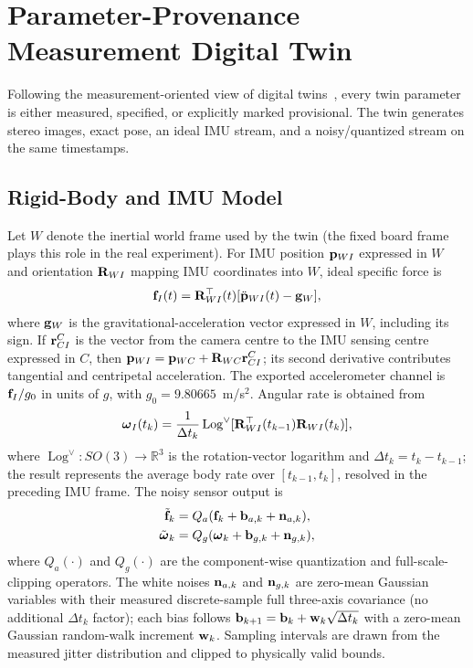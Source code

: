 \section{Parameter-Provenance Measurement Digital Twin}
\label{sec:twin}

Following the measurement-oriented view of digital
twins~\cite{wright2024dt}, every twin parameter is either
measured, specified, or explicitly marked provisional. The twin generates
stereo images, exact pose, an ideal IMU stream, and a noisy/quantized stream
on the same timestamps.

\subsection{Rigid-Body and IMU Model}
Let $W$ denote the inertial world frame used by the twin (the fixed board
frame plays this role in the real experiment). For IMU position
${\bf p}_{WI}$ expressed in $W$ and orientation ${\bf R}_{WI}$ mapping IMU
coordinates into $W$, ideal
specific force is
\begin{equation}
 {\bf f}_I(t)={\bf R}_{WI}^{\top}(t)
 [\ddot{\bf p}_{WI}(t)-{\bf g}_W], \label{eq:specific-force}
\end{equation}
where ${\bf g}_W$ is the gravitational-acceleration vector expressed in
$W$, including its sign. If ${\bf r}_{CI}^{C}$ is the vector from the camera
centre to the IMU sensing centre expressed in $C$, then
${\bf p}_{WI}={\bf p}_{WC}+{\bf R}_{WC}{\bf r}_{CI}^{C}$; its second
derivative contributes tangential and centripetal acceleration. The
exported accelerometer channel is ${\bf f}_I/g_0$ in units of $g$, with
$g_0=9.80665$~m/s$^2$. Angular rate is obtained from
\begin{equation}
 \boldsymbol\omega_I(t_k)=\frac{1}{\Delta t_k}
 \operatorname{Log}^{\vee}[{\bf R}_{WI}^{\top}(t_{k-1})
 {\bf R}_{WI}(t_k)] , \label{eq:gyro}
\end{equation}
where $\operatorname{Log}^{\vee}:SO(3)\rightarrow\mathbb R^3$ is the
rotation-vector logarithm and $\Delta t_k=t_k-t_{k-1}$; the result represents
the average body rate over $[t_{k-1},t_k]$, resolved in the preceding IMU
frame.
The noisy sensor output is
\begin{align}
 \tilde{\bf f}_k &= Q_a({\bf f}_k+{\bf b}_{a,k}+{\bf n}_{a,k}),\\
 \tilde{\boldsymbol\omega}_k &=
 Q_g(\boldsymbol\omega_k+{\bf b}_{g,k}+{\bf n}_{g,k}),
\end{align}
where $Q_a(\cdot)$ and $Q_g(\cdot)$ are the component-wise quantization and
full-scale-clipping operators. The white noises
${\bf n}_{a,k}$ and ${\bf n}_{g,k}$ are zero-mean Gaussian variables with
their measured discrete-sample full three-axis covariance (no additional
$\Delta t_k$ factor); each bias follows
${\bf b}_{k+1}={\bf b}_k+{\bf w}_k\sqrt{\Delta t_k}$ with a zero-mean
Gaussian random-walk increment ${\bf w}_k$. Sampling intervals are
drawn from the measured jitter distribution and clipped to physically valid
bounds.

